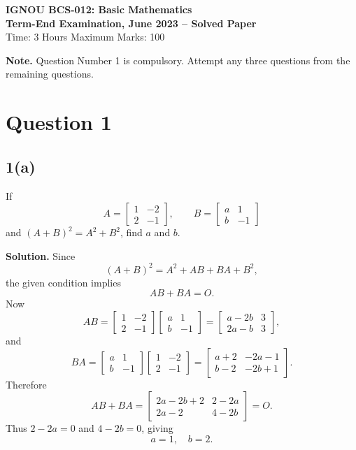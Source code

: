 \documentclass[11pt,a4paper]{article}
\newcommand{\ans}{\textbf{Solution.} }
\newcommand{\final}[1]{\[\boxed{#1}\]}
\begin{document}
\begin{center}
{\Large\bfseries IGNOU BCS-012: Basic Mathematics}\\[2mm]
{\large\bfseries Term-End Examination, June 2023 -- Solved Paper}\\[1mm]
Time: 3 Hours \qquad Maximum Marks: 100
\end{center}

\begin{questionbox}
\textbf{Note.} Question Number 1 is compulsory. Attempt any three questions from the remaining questions.
\end{questionbox}

\section*{Question 1}

\subsection*{1(a)}
\begin{questionbox}
If
\[
A=\begin{bmatrix}1&-2\\2&-1\end{bmatrix},\qquad
B=\begin{bmatrix}a&1\\ b&-1\end{bmatrix}
\]
and $(A+B)^2=A^2+B^2$, find $a$ and $b$.
\end{questionbox}
\ans
Since
\[
(A+B)^2=A^2+AB+BA+B^2,
\]
the given condition implies
\[
AB+BA=O.
\]
Now
\[
AB=\begin{bmatrix}1&-2\\2&-1\end{bmatrix}
\begin{bmatrix}a&1\\b&-1\end{bmatrix}
=
\begin{bmatrix}a-2b&3\\2a-b&3\end{bmatrix},
\]
and
\[
BA=\begin{bmatrix}a&1\\b&-1\end{bmatrix}
\begin{bmatrix}1&-2\\2&-1\end{bmatrix}
=
\begin{bmatrix}a+2&-2a-1\\b-2&-2b+1\end{bmatrix}.
\]
Therefore
\[
AB+BA=\begin{bmatrix}
2a-2b+2&2-2a\\2a-2&4-2b
\end{bmatrix}=O.
\]
Thus $2-2a=0$ and $4-2b=0$, giving
\final{a=1,\quad b=2.}
\end{document}

